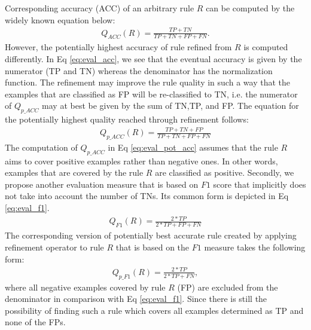 \documentclass{bmcart}
\begin{document}
Corresponding accuracy (ACC) of an arbitrary rule $R$ can be computed by the widely known equation below:
\begin{eqnarray} \label{eq:eval_acc}
Q_{ACC}(R) = \frac{TP + TN}{TP + TN + FP + FN}.
\end{eqnarray}
However, the potentially highest accuracy of rule refined from $R$ is computed differently. In Eq \ref{eq:eval_acc}, we see that the eventual accuracy is given by the numerator (TP and TN) whereas the denominator has the normalization function. The refinement may improve the rule quality in such a way that the examples that are classified as FP will be re-classified to TN, i.e. the numerator of $Q_{p\_ACC}$ may at best be given by the sum of TN,TP, and FP. The equation for the potentially highest quality reached through refinement follows:
\begin{eqnarray} \label{eq:eval_pot_acc}
Q_{p\_ACC}(R) = \frac{TP + TN + FP}{TP + TN + FP + FN}
\end{eqnarray}
The computation of $Q_{p\_ACC}$ in Eq \ref{eq:eval_pot_acc} assumes that the rule $R$ aims to cover positive examples rather than negative ones. In other words, examples that are covered by the rule $R$ are classified as positive. Secondly, we propose another evaluation measure that is based on $F1$ score that implicitly does not take into account the number of TNs. Its common form is depicted in Eq \ref{eq:eval_f1}. 
\begin{eqnarray} \label{eq:eval_f1}
    Q_{F1}(R) = \frac{2*TP}{2*TP + FP + FN}
\end{eqnarray}
The corresponding version of potentially best accurate rule created by applying refinement operator to rule $R$ that is based on the $F1$ measure takes the following form:
\begin{eqnarray} \label{eq:eval_pot_f1}
    Q_{p\_F1}(R) = \frac{2*TP}{2*TP + FN},
\end{eqnarray}
where all negative examples covered by rule $R$ (FP) are excluded from the denominator in comparison with Eq \ref{eq:eval_f1}. Since there is still the possibility of finding such a rule which covers all examples determined as TP and none of the FPs.
\end{document}
